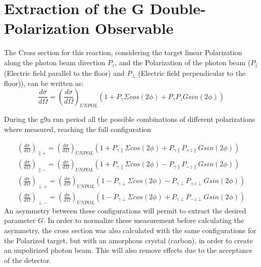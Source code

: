 \section{Extraction of the G Double-Polarization Observable}
The Cross section for this reaction, considering the target linear Polarization along the photon beam direction $P_z$, and the Polarization of the photon beam ($P_{\parallel}$ (Electric field parallel to the floor) and $P_{\perp}$ (Electric field perpendicular to the floor)), can be written as:
\begin{equation}
  \frac{d\sigma}{d\Omega} = \left(\frac{d\sigma}{d\Omega}\right)_{UNPOL}  \left( 1 + P_{\gamma}\Sigma cos(2\phi) + P_{\gamma} P_z G sin(2\phi) \right)
  \label{eqn:extract_G_S}
\end{equation}

During the g9a run period all the possible combinations of different polarizations where measured, reaching the full configuration

\begin{eqnarray}
\left(\frac{d\sigma}{d\Omega}\right)_{\parallel +} = \left(\frac{d\sigma}{d\Omega}\right)_{UNPOL}  \left( 1 + P_{\gamma \parallel}\Sigma cos(2\phi) + P_{\gamma \parallel} P_{+z\parallel} G sin(2\phi) \right) \\
\left(\frac{d\sigma}{d\Omega}\right)_{\parallel -} = \left(\frac{d\sigma}{d\Omega}\right)_{UNPOL}  \left( 1 + P_{\gamma \parallel}\Sigma cos(2\phi) - P_{\gamma \parallel} P_{-z\parallel} G sin(2\phi) \right) \\
\left(\frac{d\sigma}{d\Omega}\right)_{\perp +} = \left(\frac{d\sigma}{d\Omega}\right)_{UNPOL}  \left( 1 - P_{\gamma \perp}\Sigma cos(2\phi) - P_{\gamma \perp} P_{+z\perp} G sin(2\phi) \right) \\
\left(\frac{d\sigma}{d\Omega}\right)_{\perp -} = \left(\frac{d\sigma}{d\Omega}\right)_{UNPOL}  \left( 1 - P_{\gamma \perp}\Sigma cos(2\phi) + P_{\gamma \perp} P_{-z\perp} G sin(2\phi) \right)
\end{eqnarray}
An asymmetry between these configurations will permit to extract the desired parameter $G$. In order to normalize these measurement before calculating the asymmetry, the cross section was also calculated with the same configurations for the Polarized target, but with an amorphous crystal (carbon), in order to create an unpolirized photon beam. This will also remove effects due to the acceptance of the detector. 

